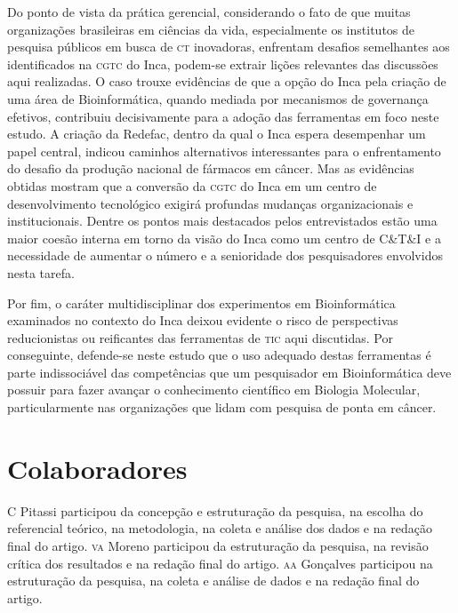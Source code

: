 \documentclass{article}
\begin{document}
Do ponto de vista da prática gerencial, considerando o fato de que muitas
organizações brasileiras em ciências da vida, especialmente os institutos de
pesquisa públicos em busca de \textsc{ct} inovadoras, enfrentam desafios semelhantes aos
identificados na \textsc{cgtc} do Inca, podem-se extrair lições relevantes das discussões
aqui realizadas. O caso trouxe evidências de que a opção do Inca pela criação de
uma área de Bioinformática, quando mediada por mecanismos de governança
efetivos, contribuiu decisivamente para a adoção das ferramentas em foco neste
estudo. A criação da Redefac, dentro da qual o Inca espera desempenhar um papel
central, indicou caminhos alternativos interessantes para o enfrentamento do
desafio da produção nacional de fármacos em câncer. Mas as evidências obtidas
mostram que a conversão da \textsc{cgtc} do Inca em um centro de desenvolvimento
tecnológico exigirá profundas mudanças organizacionais e institucionais. Dentre
os pontos mais destacados pelos entrevistados estão uma maior coesão interna em
torno da visão do Inca como um centro de C\&T\&I e a necessidade de aumentar o
número e a senioridade dos pesquisadores envolvidos nesta tarefa.

Por fim, o caráter multidisciplinar dos experimentos em Bioinformática
examinados no contexto do Inca deixou evidente o risco de perspectivas
reducionistas ou reificantes das ferramentas de \textsc{tic} aqui discutidas. Por
conseguinte, defende-se neste estudo que o uso adequado destas ferramentas é
parte indissociável das competências que um pesquisador em Bioinformática deve
possuir para fazer avançar o conhecimento científico em Biologia Molecular,
particularmente nas organizações que lidam com pesquisa de ponta em câncer.

\section{Colaboradores}

C Pitassi participou da concepção e estruturação da pesquisa, na escolha do
referencial teórico, na metodologia, na coleta e análise dos dados e na redação
final do artigo. \textsc{va} Moreno participou da estruturação da pesquisa, na revisão
crítica dos resultados e na redação final do artigo. \textsc{aa} Gonçalves participou na
estruturação da pesquisa, na coleta e análise de dados e na redação final do
artigo.
\end{document}
